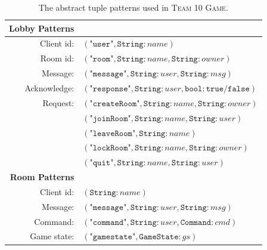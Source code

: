 \begin{table}[htbp]
    \centering
    \begin{tabular}{rl}
    \textbf{Lobby Patterns} & \\
    \hline 
        Client id: & $(\texttt{"user"}, \texttt{String} : name)$  \\
        Room id: & $(\texttt{"room"}, \texttt{String} : name, \texttt{String} : owner)$
        \\
        Message: & $(\texttt{"message"}, \texttt{String} : user, \texttt{String} : msg)$
        \\
        Acknowledge: & $(\texttt{"response"}, \texttt{String} : user, \texttt{bool} : \texttt{true}/\texttt{false})$
        \\  
        Request: & $(\texttt{"createRoom"}, \texttt{String} : name, \texttt{String} : owner)$
        \\
        & $(\texttt{"joinRoom"}, \texttt{String} : name, \texttt{String} : user)$
        \\
        & $(\texttt{"leaveRoom"}, \texttt{String} : name)$
        \\
        & $(\texttt{"lockRoom"}, \texttt{String} : name, \texttt{String} : owner)$
        \\
        & $(\texttt{"quit"}, \texttt{String} : name, \texttt{String} : user)$
        \\
    \textbf{Room Patterns} & \\
    \hline
    Client id: & $(\texttt{String} : name)$  
    \\
    Message: & $(\texttt{"message"}, \texttt{String} : user, \texttt{String} : msg)$
    \\
    Command: & $(\texttt{"command"}, \texttt{String} : user, \texttt{Command} : cmd)$ 
    \\
    Game state: & $(\texttt{"gamestate"}, \texttt{GameState} : gs)$
    \\
    \end{tabular}
    \caption{The abstract tuple patterns used in \textsc{Team 10 Game}.}
    \label{tab:tuplepatterns}
\end{table}

